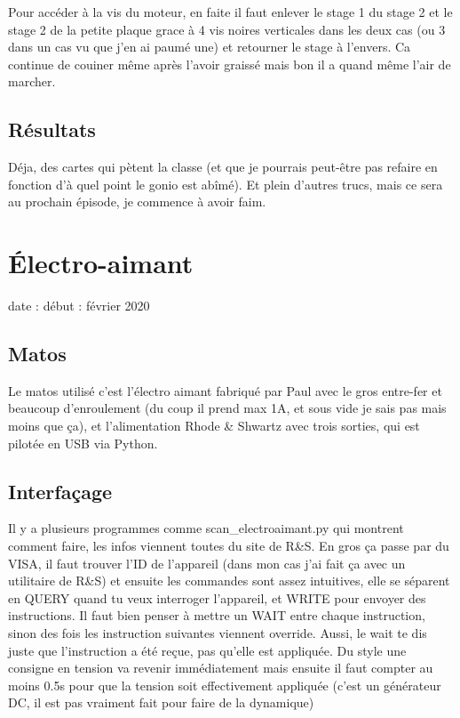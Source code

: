 \documentclass[a4paper]{report}
\begin{document}
  Pour accéder à la vis du moteur, en faite il faut enlever le stage 1 du stage 2 et le stage 2 de la petite plaque grace à 4 vis noires verticales dans les deux cas (ou 3 dans un cas vu que j'en ai paumé une) et retourner le stage à l'envers. Ca continue de couiner même après l'avoir graissé mais bon il a quand même l'air de marcher.
  \subsection{Résultats}
  Déja, des cartes qui pètent la classe (et que je pourrais peut-être pas refaire en fonction d'à quel point le gonio est abîmé). Et plein d'autres trucs, mais ce sera au prochain épisode, je commence à avoir faim.

 \section{Électro-aimant}
 date : début : février 2020
 \subsection{Matos}
 Le matos utilisé c'est l'électro aimant fabriqué par Paul avec le gros entre-fer et beaucoup d'enroulement (du coup il prend max 1A, et sous vide je sais pas mais moins que ça), et l'alimentation Rhode \& Shwartz avec trois sorties, qui est pilotée en USB via Python.
 \subsection{Interfaçage}
 Il y a plusieurs programmes comme scan\_electroaimant.py qui montrent comment faire, les infos viennent toutes du site de R\&S. En gros ça passe par du VISA, il faut trouver l'ID de l'appareil (dans mon cas j'ai fait ça avec un utilitaire de R\&S) et ensuite les commandes sont assez intuitives, elle se séparent en QUERY quand tu veux interroger l'appareil, et WRITE pour envoyer des instructions. Il faut bien penser à mettre un WAIT entre chaque instruction, sinon des fois les instruction suivantes viennent override.
 Aussi, le wait te dis juste que l'instruction a été reçue, pas qu'elle est appliquée. Du style une consigne en tension va revenir immédiatement mais ensuite il faut compter au moins 0.5s pour que la tension soit effectivement appliquée (c'est un générateur DC, il est pas vraiment fait pour faire de la dynamique)
\end{document}
